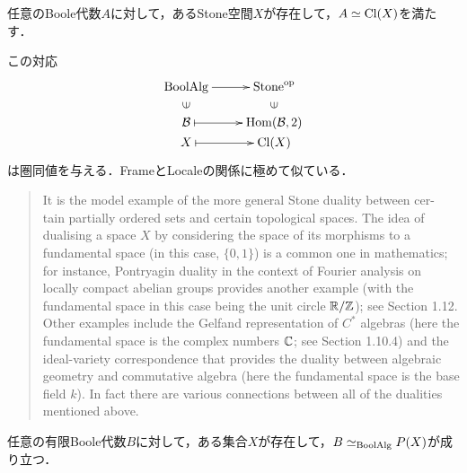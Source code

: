 \documentclass[uplatex, dvipdfmx]{jsreport}
\renewcommand{\B}{\mathcal{B}}
\begin{document}
\begin{theorem}[Stone表現定理]
    任意のBoole代数$A$に対して，あるStone空間$X$が存在して，$A\simeq\mathrm{Cl}(X)$を満たす．
\end{theorem}
\begin{remarks}
    この対応
    \[\xymatrix@R-2pc{
        \BoolAlg\ar[r]&\Stone^\op\\
        \rotatebox[origin=c]{90}{$\in$}&\rotatebox[origin=c]{90}{$\in$}\\
        \B\ar@{|->}[r]&\Hom(\B,2)\\
        X\ar@{|->}[r]&\Cl(X)
    }\]
    は圏同値を与える．FrameとLocaleの関係に極めて似ている．
    \begin{quote}
        It is the model example of the more general Stone duality between cer- tain partially ordered sets and certain topological spaces.
        The idea of dualising a space $X$ by considering the space of its morphisms to a fundamental space (in this case, $\{0, 1\}$) is a common one in mathematics; for instance, Pontryagin duality in the context of Fourier analysis on locally compact abelian groups provides another example (with the fundamental space in this case being the unit circle $\mathbb{R}/\mathbb{Z}$); see Section 1.12. Other examples include the Gelfand representation of $C^*$ algebras (here the fundamental space is the complex numbers $\mathbb{C}$; see Section 1.10.4) and the ideal-variety correspondence that provides the duality between algebraic geometry and commutative algebra (here the fundamental space is the base field $k$). In fact there are various connections between all of the dualities mentioned above.
    \end{quote}
\end{remarks}

\begin{lemma}[Birkhoff表現定理]
    任意の有限Boole代数$B$に対して，ある集合$X$が存在して，$B\simeq_{\mathrm{BoolAlg}} P(X)$が成り立つ．
\end{lemma}
\end{document}
